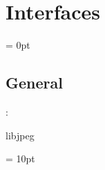 
\section{Interfaces} 


\parskip = 0pt

\vspace{3mm} \subsection*{General}

: 

libjpeg
\vspace{2mm}

\vspace{5mm}\parskip = 10pt 
